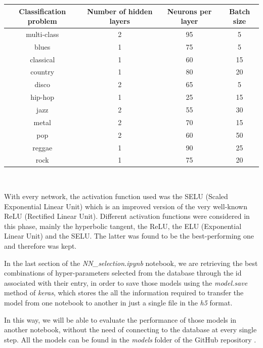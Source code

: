 \documentclass{Configuration_Files/PoliMi3i_thesis}
\begin{document}
\begin{table}[H]
    \centering 
    \begin{tabular}{|c | c c c |}
    \hline
    \rowcolor{bluepoli!40} 
     Classification problem & Number of hidden layers & Neurons per layer  & Batch size \T\B \\
    \hline \hline
    multi-class & 2 & 95 & 5  \T\B \\
    blues & 1 & 75 & 5   \T\B \\
    classical & 1 & 60 & 15   \T\B \\
    country & 1 & 80 & 20   \T\B \\
    disco & 2 & 65 & 5   \T\B \\
    hip-hop & 1 & 25 & 15   \T\B \\
    jazz & 2 & 55 & 30   \T\B \\
    metal & 2 & 70 & 15   \T\B \\
    pop & 2 & 60 & 50   \T\B \\
    reggae & 1 & 90 & 25   \T\B \\
    rock & 1 & 75 & 20   \T\B \\
    \hline
    \end{tabular}
    \\[10pt]
\end{table}

With every network, the activation function used was the SELU (Scaled Exponential Linear Unit) which is an improved version of the very well-known ReLU (Rectified Linear Unit). Different activation functions were considered in this phase, mainly the hyperbolic tangent, the ReLU, the ELU (Exponential Linear Unit) and the SELU. The latter was found to be the best-performing one and therefore was kept.

In the last section of the \textit{NN\_selection.ipynb} notebook, we are retrieving the best combinations of hyper-parameters selected from the database through the id associated with their entry, in order to save those models using the \textit{model.save} method of \textit{keras}, which stores the all the information required to transfer the model from one notebook to another in just a single file in the \textit{h5} format. 

In this way, we will be able to evaluate the performance of those models in another notebook, without the need of connecting to the database at every single step.
All the models can be found in the \textit{models} folder of the GitHub repository \cite{project-repository}.
\end{document}
